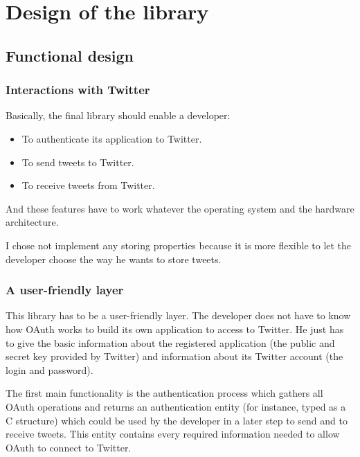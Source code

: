\chapter{Design of the library}


\section{Functional design}

\subsection{Interactions with Twitter}

\hspace{15mm}Basically, the final library should enable a developer:
\begin{itemize}
\item To authenticate its application to Twitter. 
\item To send tweets to Twitter.
\item To receive tweets from Twitter.
\end{itemize}

And these features have to work whatever the operating system and the hardware architecture.

I chose not implement any storing properties because it is more flexible to let the developer choose the way he wants to store tweets.


\subsection{A user-friendly layer}

\hspace{15mm}This library has to be a user-friendly layer. The developer does not have to know how OAuth works to build its own application to access to Twitter. He just has to give the basic information about the registered application (the public and secret key provided by Twitter) and information about its Twitter account (the login and password).

The first main functionality is the authentication process which gathers all OAuth operations and returns an authentication entity (for instance, typed as a C structure) which could be used by the developer in a later step to send and to receive tweets. This entity contains every required information needed to allow OAuth to connect to Twitter. 

